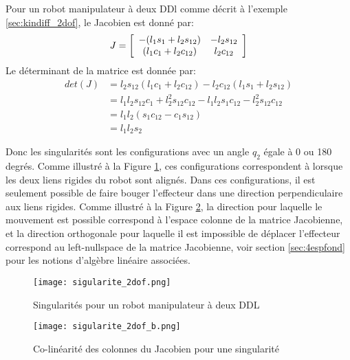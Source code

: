 \begin{example}

Pour un robot manipulateur à deux DDl comme décrit à l'exemple \ref{sec:kindiff_2dof}, le Jacobien est donné par:
\begin{align}
J = \left[ \begin{array}{c c} 
-(l_1 s_1 + l_2 s_{12}) & - l_2 s_{12} \\
 (l_1 c_1 + l_2 c_{12}) &   l_2 c_{12}
\end{array} \right]
\end{align} 
Le déterminant de la matrice est donnée par:
\begin{align}
det(J) &= l_2 s_{12} (l_1 c_1 + l_2 c_{12}) - l_2 c_{12} (l_1 s_1 + l_2 s_{12}) \\
       &= l_1 l_2 s_{12} c_1 + l_2^2 s_{12} c_{12} - l_1 l_2 s_1 c_{12} - l_2^2 s_{12} c_{12} \\
			 &= l_1 l_2 ( s_1 c_{12} - c_1 s_{12} ) \\
			 &= l_1 l_2 s_2
\end{align} 

Donc les singularités sont les configurations avec un angle $q_2$ égale à 0 ou 180 degrés. Comme illustré à la Figure \ref{fig:sigularite_2dof}, ces configurations correspondent à lorsque les deux liens rigides du robot sont alignés. Dans ces configurations, il est seulement possible de faire bouger l'effecteur dans une direction perpendiculaire aux liens rigides. Comme illustré à la Figure \ref{fig:sigularite_2dof_b}, la direction pour laquelle le mouvement est possible correspond à l'espace colonne de la matrice Jacobienne, et la direction orthogonale pour laquelle il est impossible de déplacer l'effecteur correspond au left-nullspace de la matrice Jacobienne, voir section \ref{sec:4espfond} pour les notions d'algèbre linéaire associées.

\begin{figure}[H]
	\centering
		\texttt{[image: sigularite\_2dof.png]}
	\caption{Singularités pour un robot manipulateur à deux DDL}
	\label{fig:sigularite_2dof}
\end{figure}

\begin{figure}[H]
	\centering
		\texttt{[image: sigularite\_2dof\_b.png]}
	\caption{Co-linéarité des colonnes du Jacobien pour une singularité}
	\label{fig:sigularite_2dof_b}
\end{figure}

\end{example}



